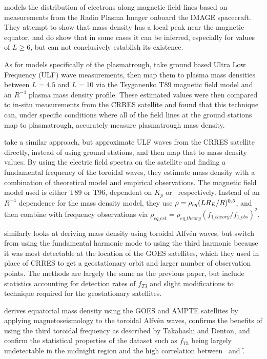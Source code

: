 \cite{Denton2006} models the distribution of electrons along magnetic field lines based on measurements from the Radio Plasma Imager onboard the IMAGE spacecraft. They attempt to show that mass density has a local peak near the magnetic equator, and do show that in some cases it can be inferred, especially for values of $L \ge 6$, but can not conclusively establish its existence. 

As for models specifically of the plasmatrough, \cite{Lotoaniu1999PlasmaMassDensity} take ground based Ultra Low Frequency (ULF) wave measurements, then map them to plasma mass densities between $L=4.5$ and $L=10$ via the Tsyganenko T89 magnetic field model and an $R^{-4}$ plasma mass density profile. These estimated values were then compared to in-situ measurements from the CRRES satellite and found that this technique can, under specific conditions where all of the field lines at the ground stations map to plasmatrough, accurately measure plasmatrough mass density. 

\cite{Takahashi2006MassDensityInferred} take a similar approach, but approximate ULF waves from the CRRES satellite directly, instead of using ground stations, and then map that to mass density values. By using the electric field spectra on the satellite and finding a fundamental frequency of the toroidal waves, they estimate mass density with a combination of theoretical model and empirical observations. The magnetic field model used is either T89 or T96, dependent on $K_p$ or \dst\  respectively. Instead of an $R^{-4}$ dependence for the mass density model, they use $\rho=\rho_{eq}(LR_E/R)^{0.5}$, and then combine with frequency observations via $\rho_{eq\_est}=\rho_{eq\_theory}(f_{1\_theory}/f_{1\_obs})^2$.

\cite{Takahashi2010SolarCycleVariation} similarly looks at deriving mass density using toroidal Alfvén waves, but switch from using the fundamental harmonic mode to using the third harmonic because it was most detectable at the location of the GOES satellites, which they used in place of CRRES to get a geostationary orbit and larger number of observation points. The methods are largely the same as the previous paper, but include statistics accounting for detection rates of $f_{T3}$ and slight modifications to technique required for the geostationary satellites.

\cite{Min2013} derives equatorial mass density using the GOES and AMPTE satellites by applying magnetoseismology to the toroidal Alfvén waves, confirms the benefits of using the third toroidal frequency as described by Takahashi and Denton, and confirm the statistical properties of the dataset such as $f_{T3}$ being largely undetectable in the midnight region and the high correlation between \req\ and \f.

